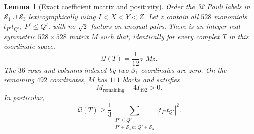 \documentclass[11pt]{article}
\newtheorem{lemma}[theorem]{Lemma}
\theoremstyle{definition}
\begin{document}
\begin{lemma}[Exact coefficient matrix and positivity]
\label{o2gc:lem-matrix}
Order the 32 Pauli labels in \(\mathcal S_1\cup\mathcal S_3\)
lexicographically using \(I<X<Y<Z\). Let \(z\) contain all
\(528\) monomials \(t_{P'}t_{Q'}\), \(P'\le Q'\), with no
\(\sqrt2\) factors on unequal pairs. There is an integer real
symmetric \(528\times528\) matrix \(M\) such that, identically for
every complex \(T\) in this coordinate space,
\begin{equation}
 \mathcal Q(T)=\frac1{12}z^\dagger Mz.
 \label{o2gc:matrix-identity}
\end{equation}
The \(36\) rows and columns indexed by two \(\mathcal S_1\)
coordinates are zero. On the remaining \(492\) coordinates,
\(M\) has \(111\) blocks and satisfies
\begin{equation}
 M_{\mathrm{remaining}}-4I_{492}>0.
 \label{o2gc:matrix-positive}
\end{equation}
In particular,
\begin{equation}
 \mathcal Q(T)\ge\frac13
 \sum_{\substack{P'\le Q'\\
 P'\in\mathcal S_3\ \text{or}\ Q'\in\mathcal S_3}}
 |t_{P'}t_{Q'}|^2.
 \label{o2gc:coercive}
\end{equation}
\end{lemma}
\end{document}
